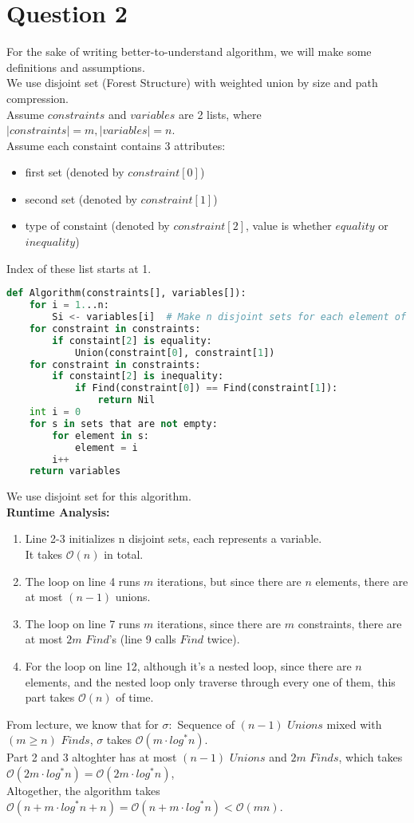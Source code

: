 \documentclass[10pt]{article}
\begin{document}
\section*{Question 2}
For the sake of writing better-to-understand algorithm, we will make some definitions and assumptions.\\
We use disjoint set (Forest Structure) with weighted union by size and path compression.\\
Assume $constraints$ and $variables$ are 2 lists, where $|constraints|=m, |variables|=n$.\\
Assume each constaint contains 3 attributes: 
\begin{itemize}
\item first set (denoted by $constraint[0]$)
\item second set (denoted by $constraint[1]$)
\item type of constaint (denoted by $constraint[2]$, value is whether $equality$ or $inequality$)
\end{itemize}
Index of these list starts at 1.
\begin{lstlisting}[language=Python]
def Algorithm(constraints[], variables[]):
	for i = 1...n:
		Si <- variables[i]	# Make n disjoint sets for each element of variables named S1...Sn
	for constraint in constraints:
		if constaint[2] is equality:
			Union(constraint[0], constraint[1])
	for constraint in constraints:
		if constaint[2] is inequality:
			if Find(constraint[0]) == Find(constraint[1]):
				return Nil
	int i = 0
	for s in sets that are not empty:
		for element in s:
			element = i		
		i++
	return variables
\end{lstlisting}
We use disjoint set for this algorithm.\\
\textbf{Runtime Analysis:}
\begin{enumerate}
\item Line 2-3 initializes n disjoint sets, each represents a variable.\\
It takes $\mathcal{O}(n)$ in total.
\item The loop on line 4 runs $m$ iterations, but since there are $n$ elements, there are at most $(n-1)$ unions.
\item The loop on line 7 runs $m$ iterations, since there are $m$ constraints, there are at most $2m$ $Find$'s (line 9 calls $Find$ twice).
\item For the loop on line 12, although it's a nested loop, since there are $n$ elements, and the nested loop only traverse through every one of them, this part takes $\mathcal{O}(n)$ of time.
\end{enumerate}
From lecture, we know that for $\sigma:$ Sequence of $(n-1)$ $Unions$ mixed with $(m\geq n)$ $Finds$, $\sigma$ takes $\mathcal{O}(m\cdot log^*n)$.\\
Part 2 and 3 altoghter has at most $(n-1)$ $Unions$ and $2m$ $Finds$, which takes $\mathcal{O}(2m\cdot log^*n)=\mathcal{O}(2m\cdot log^*n)$,\\
Altogether, the algorithm takes $\mathcal{O}(n+m\cdot log^*n + n)=\mathcal{O}(n+m\cdot log^*n)<\mathcal{O}(mn)$.
\end{document}
